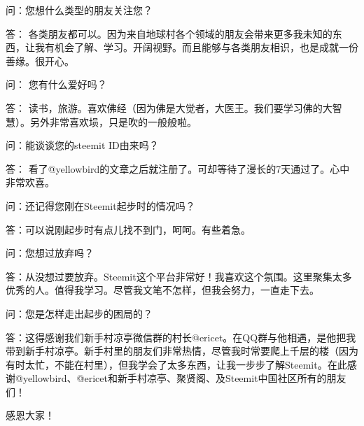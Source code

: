 \documentclass[]{ctexbook}
\begin{document}
问：您想什么类型的朋友关注您？

答： 各类朋友都可以。因为来自地球村各个领域的朋友会带来更多我未知的东西，让我有机会了解、学习。开阔视野。而且能够与各类朋友相识，也是成就一份善缘。很开心。

问： 您有什么爱好吗？

答： 读书，旅游。喜欢佛经（因为佛是大觉者，大医王。我们要学习佛的大智慧）。另外非常喜欢埙，只是吹的一般般啦。

问：能谈谈您的steemit ID由来吗？

答： 看了@yellowbird的文章之后就注册了。可却等待了漫长的7天通过了。心中非常欢喜。

问：还记得您刚在Steemit起步时的情况吗？

答：可以说刚起步时有点儿找不到门，呵呵。有些着急。

问：您想过放弃吗？

答：从没想过要放弃。Steemit这个平台非常好！我喜欢这个氛围。这里聚集太多优秀的人。值得我学习。尽管我文笔不怎样，但我会努力，一直走下去。

问：您是怎样走出起步的困局的？

答：这得感谢我们新手村凉亭微信群的村长@ericet。在QQ群与他相遇，是他把我带到新手村凉亭。新手村里的朋友们非常热情，尽管我时常要爬上千层的楼（因为有时太忙，不能在村里），但我学会了太多东西，让我一步步了解Steemit。在此感谢@yellowbird、@ericet和新手村凉亭、聚贤阁、及Steemit中国社区所有的朋友们！

感恩大家！
\end{document}
